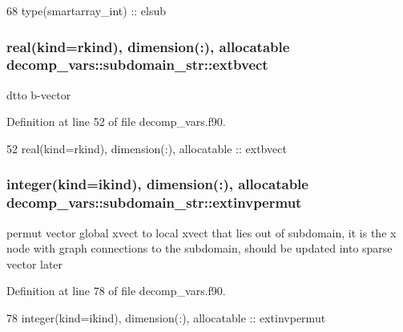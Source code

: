 \begin{DoxyCode}
68     \textcolor{keywordtype}{type}(smartarray_int) :: elsub
\end{DoxyCode}
\subsubsection[{extbvect}]{\setlength{\rightskip}{0pt plus 5cm}real(kind=rkind), dimension(\+:), allocatable decomp\+\_\+vars\+::subdomain\+\_\+str\+::extbvect}\label{structdecomp__vars_1_1subdomain__str_add9b486f352dd3ec672e348dd7dbbe8e}


dtto b-\/vector 



Definition at line 52 of file decomp\+\_\+vars.\+f90.


\begin{DoxyCode}
52     \textcolor{keywordtype}{real(kind=rkind)}, \textcolor{keywordtype}{dimension(:)}, \textcolor{keywordtype}{allocatable} :: extbvect
\end{DoxyCode}
\subsubsection[{extinvpermut}]{\setlength{\rightskip}{0pt plus 5cm}integer(kind=ikind), dimension(\+:), allocatable decomp\+\_\+vars\+::subdomain\+\_\+str\+::extinvpermut}\label{structdecomp__vars_1_1subdomain__str_ac63af2fb70836c212b0dfbb058a8e46e}


permut vector global xvect to local xvect that lies out of subdomain, it is the x node with graph connections to the subdomain, should be updated into sparse vector later 



Definition at line 78 of file decomp\+\_\+vars.\+f90.


\begin{DoxyCode}
78     \textcolor{keywordtype}{integer(kind=ikind)}, \textcolor{keywordtype}{dimension(:)}, \textcolor{keywordtype}{allocatable} :: extinvpermut
\end{DoxyCode}
